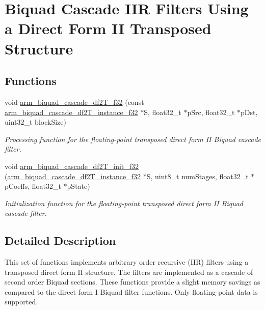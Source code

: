 \hypertarget{group___biquad_cascade_d_f2_t}{\section{Biquad Cascade I\-I\-R Filters Using a Direct Form I\-I Transposed Structure}
\label{group___biquad_cascade_d_f2_t}
}
\subsection*{Functions}
\begin{DoxyCompactItemize}
\item 
void \hyperlink{group___biquad_cascade_d_f2_t_ga646c25998bf35991c60299b1431460f7}{arm\-\_\-biquad\-\_\-cascade\-\_\-df2\-T\-\_\-f32} (const \hyperlink{structarm__biquad__cascade__df2_t__instance__f32}{arm\-\_\-biquad\-\_\-cascade\-\_\-df2\-T\-\_\-instance\-\_\-f32} $\ast$S, float32\-\_\-t $\ast$p\-Src, float32\-\_\-t $\ast$p\-Dst, uint32\-\_\-t block\-Size)
\begin{DoxyCompactList}\small\item\em Processing function for the floating-\/point transposed direct form I\-I Biquad cascade filter. \end{DoxyCompactList}\item 
void \hyperlink{group___biquad_cascade_d_f2_t_ga70eaddf317a4a8bde6bd6a97df67fedd}{arm\-\_\-biquad\-\_\-cascade\-\_\-df2\-T\-\_\-init\-\_\-f32} (\hyperlink{structarm__biquad__cascade__df2_t__instance__f32}{arm\-\_\-biquad\-\_\-cascade\-\_\-df2\-T\-\_\-instance\-\_\-f32} $\ast$S, uint8\-\_\-t num\-Stages, float32\-\_\-t $\ast$p\-Coeffs, float32\-\_\-t $\ast$p\-State)
\begin{DoxyCompactList}\small\item\em Initialization function for the floating-\/point transposed direct form I\-I Biquad cascade filter. \end{DoxyCompactList}\end{DoxyCompactItemize}


\subsection{Detailed Description}
This set of functions implements arbitrary order recursive (I\-I\-R) filters using a transposed direct form I\-I structure. The filters are implemented as a cascade of second order Biquad sections. These functions provide a slight memory savings as compared to the direct form I Biquad filter functions. Only floating-\/point data is supported.

